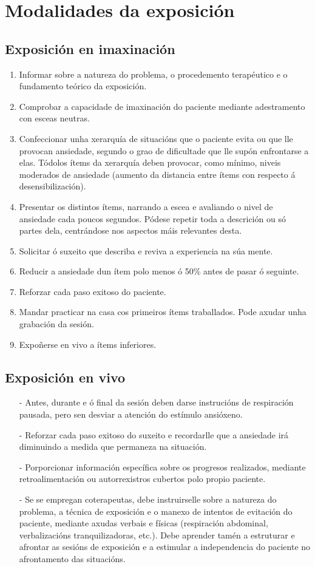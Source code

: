 \documentclass[a4paper,11pt]{article}
\begin{document}
\section{Modalidades da exposición}
\subsection{Exposición en imaxinación}
\begin{enumerate}
	\item Informar sobre a natureza do problema, o procedemento terapéutico e o fundamento teórico da 
	exposición.
	\item Comprobar a capacidade de imaxinación do paciente mediante adestramento con esceas neutras.
	\item Confeccionar unha xerarquía de situacións que o paciente evita ou que lle provocan 
	ansiedade, segundo o grao de dificultade que lle supón enfrontarse a elas. Tódolos ítems da 
	xerarquía deben provocar, como mínimo, niveis moderados de ansiedade (aumento da distancia entre 
	ítems con respecto á desensibilización). 
	\item Presentar os distintos ítems, narrando a escea e avaliando o nivel de ansiedade cada poucos 
	segundos. Pódese repetir toda a descrición ou só partes dela, centrándose nos aspectos máis 
	relevantes desta.
	\item Solicitar ó suxeito que describa e reviva a experiencia na súa mente. 
	\item Reducir a ansiedade dun ítem polo menos ó 50\% antes de pasar ó seguinte. 
	\item Reforzar cada paso exitoso do paciente.
	\item Mandar practicar na casa cos primeiros ítems traballados. Pode axudar unha grabación da 
	sesión.
	\item Expoñerse en vivo a ítems inferiores.
\end{enumerate}

\subsection{Exposición en vivo}
\begin{itemize}
	\item[-] Antes, durante e ó final da sesión deben darse instrucións de respiración pausada, pero 
	sen desviar a atención do estímulo ansióxeno.
	\item[-] Reforzar cada paso exitoso do suxeito e recordarlle que a ansiedade irá diminuindo a 
	medida que permaneza na situación.
	\item[-] Porporcionar información específica sobre os progresos realizados, mediante 
	retroalimentación ou autorrexistros cubertos polo propio paciente.
	\item[-] Se se empregan coterapeutas, debe instruirselle sobre a natureza do problema, a técnica 
	de exposición e o manexo de intentos de evitación do paciente, mediante axudas verbais e físicas 
	(respiración abdominal, verbalizacións tranquilizadoras, etc.). Debe aprender tamén a estruturar 
	e afrontar as sesións de exposición e a estimular a independencia do paciente no afrontamento das 
	situacións. 
\end{itemize}
\end{document}
